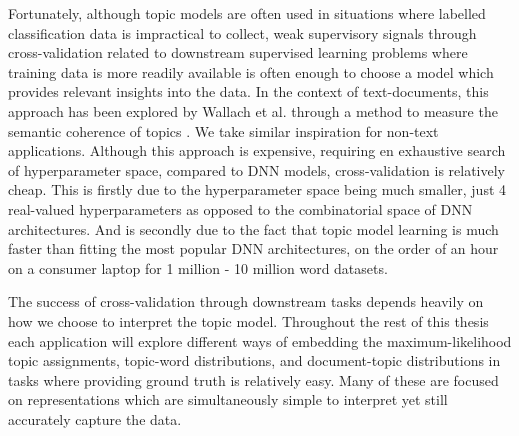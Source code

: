 Fortunately, although topic models are often used in situations where labelled classification data is impractical to collect, weak supervisory signals through cross-validation related to downstream supervised learning problems where training data is more readily available is often enough to choose a model which provides relevant insights into the data. In the context of text-documents, this approach has been explored by Wallach et al. through a method to measure the semantic coherence of topics \citep{Wallach2009}. We take similar inspiration for non-text applications. Although this approach is expensive, requiring en exhaustive search of hyperparameter space, compared to DNN models, cross-validation is relatively cheap. This is firstly due to the hyperparameter space being much smaller, just 4 real-valued hyperparameters as opposed to the combinatorial space of DNN architectures. And is secondly due to the fact that topic model learning is much faster than fitting the most popular DNN architectures, on the order of an hour on a consumer laptop for 1 million - 10 million word datasets.

The success of cross-validation through downstream tasks depends heavily on how we choose to interpret the topic model. Throughout the rest of this thesis each application will explore different ways of embedding the maximum-likelihood topic assignments, topic-word distributions, and document-topic distributions in tasks where providing ground truth is relatively easy. Many of these are focused on representations which are simultaneously simple to interpret yet still accurately capture the data.
